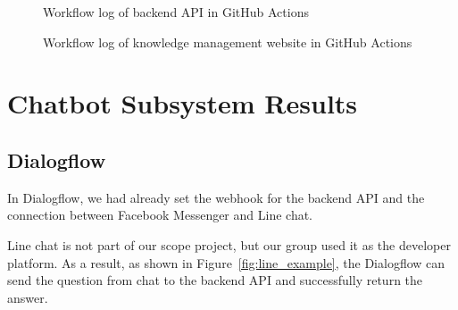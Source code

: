 \documentclass[12pt,oneside,openright,a4paper]{cpe-english-project}
\begin{document}
\begin{figure}[!h]\centering
	\caption{Workflow log of backend API in GitHub Actions}\label{fig:ci-cd-be}
\end{figure}

\begin{figure}[!h]\centering
	\caption{Workflow log of knowledge management website in GitHub Actions}\label{fig:ci-cd-fe}
\end{figure}

\pagebreak
\section{Chatbot Subsystem Results}
\subsection{Dialogflow}
In Dialogflow, we had already set the webhook for the backend API
and the connection between Facebook Messenger and Line chat.

Line chat is not part of our scope project,
but our group used it as the developer platform.
As a result, as shown in Figure~\ref*{fig:line_example},
the Dialogflow can send the question from chat to the backend API and successfully return the answer.
\end{document}

